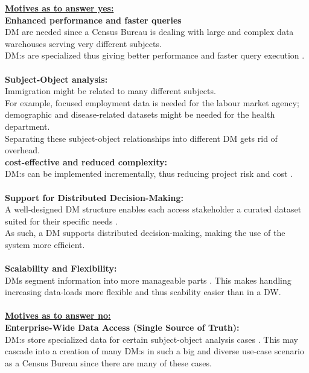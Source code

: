 \textbf{\underline{Motives as to answer yes:}}\\
\textbf{Enhanced performance and faster queries}\\
DM are needed since a Census Bureau is dealing with large and complex data warehouses serving very different subjects.\\
DM:s are specialized thus giving better performance and faster query execution \cite[p.1242]{CourseLitt}.
\\\\
\textbf{Subject-Object analysis:}\\
Immigration might be related to many different subjects.\\
For example, focused employment data is needed for the labour market agency;\\
demographic and disease-related datasets might be needed for the health department.\\
Separating these subject-object relationships into different DM gets rid of overhead\cite[p.1243]{CourseLitt}.
\\
\textbf{cost-effective and reduced complexity:}\\
DM:s can be implemented incrementally, thus reducing project risk and cost \cite[p.1259]{CourseLitt}.
\\\\
\textbf{Support for Distributed Decision-Making:}\\
A well-designed DM structure enables each access stakeholder a curated dataset suited for their specific needs \cite[p.1243]{CourseLitt}.\\
As such, a DM supports distributed decision-making, making the use of the system more efficient.
\\\\
\textbf{Scalability and Flexibility:}\\
DMs segment information into more manageable parts \cite[p.1243]{CourseLitt}. 
This makes handling increasing data-loads more flexible and thus scability easier than in a DW.
\\\\
\textbf{\underline{Motives as to answer no:}}\\
\textbf{Enterprise-Wide Data Access (Single Source of Truth):}\\
DM:s store specialized data for certain subject-object analysis cases \cite[p.1243]{CourseLitt}. 
This may cascade into a creation of many DM:s in such a big and diverse use-case scenario as a Census Bureau since there are many of these cases.

